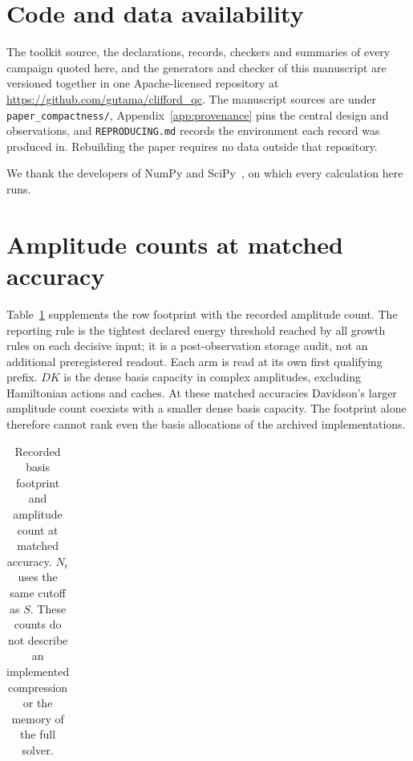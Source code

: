 \documentclass[aps,pra,reprint,superscriptaddress,nofootinbib,floatfix,
  showkeys,raggedbottom]{revtex4-2}
\newcommand{\tightcolumns}{\setlength{\tabcolsep}{3.2pt}}
\begin{document}
\section*{Code and data availability}

The toolkit source, the declarations, records, checkers and summaries of every
campaign quoted here, and the generators and checker of this manuscript are
versioned together in one Apache-licensed repository at
\url{https://github.com/gutama/clifford_qc}. The manuscript sources are under
\texttt{paper\_compactness/}, Appendix~\ref{app:provenance} pins the central
design and observations, and \texttt{REPRODUCING.md} records the
environment each record was produced in. Rebuilding the paper requires no data
outside that repository.

\begin{acknowledgments}
We thank the developers of NumPy and SciPy~\cite{harris2020numpy,
virtanen2020scipy}, on which every calculation here runs.
\end{acknowledgments}

\appendix

\section{Amplitude counts at matched accuracy}
\label{app:storage}

Table~\ref{tab:storage} supplements the row footprint with the recorded
amplitude count. The reporting rule is the tightest declared energy threshold
reached by all growth rules on each decisive input; it is a post-observation
storage audit, not an additional preregistered readout. Each arm is read at
its own first qualifying prefix. $DK$ is the dense basis capacity in complex
amplitudes, excluding Hamiltonian actions and caches.
At these matched accuracies Davidson's larger amplitude count coexists with
a smaller dense basis capacity. The footprint alone therefore cannot rank
even the basis allocations of the archived implementations.

\begin{table}[h]
\caption{Recorded basis footprint and amplitude count at matched accuracy.
$N_\epsilon$ uses the same cutoff as $S$. These counts do not describe an
implemented compression or the memory of the full solver.}
\label{tab:storage}
\begin{ruledtabular}
\tightcolumns
\begin{tabular}{lrrrr}

\end{tabular}
\end{ruledtabular}
\end{table}
\end{document}
